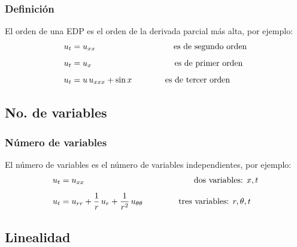\documentclass[12pt]{beamer}
\begin{document}
\begin{frame}
\frametitle{Definición}
El orden de una EDP es el orden de la derivada parcial más alta, por ejemplo:
\pause
\begin{align*}
u_{t} &= u_{xx} \hspace{3.3cm} \mbox{es de segundo orden} \\[0.5em]
u_{t} &= u_{x} \hspace{3.5cm} \mbox{es de primer orden} \\[0.5em]
u_{t} &= u \, u_{xxx} + \sin x \hspace{1.4cm} \mbox{es de tercer orden}
\end{align*}
\end{frame}

\subsection*{No. de variables}

\begin{frame}
\frametitle{Número de variables}
El número de variables es el número de variables independientes, por ejemplo:
\pause
\begin{align*}
u_{t} &= u_{xx} \hspace{3cm} \hspace{1.61cm} \mbox{dos variables: } x, t \\[0.5em] 
u_{t} &= u_{rr} + \dfrac{1}{r} \, u_{r} + \dfrac{1}{r^{2}} \, u_{\theta \theta} \hspace{1.5cm} \mbox{tres variables: } r, \theta, t
\end{align*}
\end{frame}

\subsection*{Linealidad}
\end{document}
